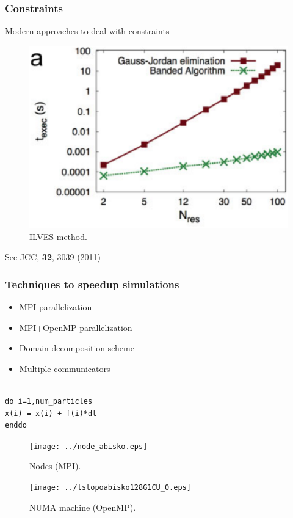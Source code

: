 \documentclass{beamer}
\begin{document}
\begin{frame}\frametitle{Constraints}

Modern approaches to deal with constraints
\begin{figure}
\includegraphics[scale=0.28]{ilves.eps}
\caption{{\scriptsize  ILVES method.}}
\end{figure}

See JCC, {\bf 32}, 3039 (2011)
\end{frame}

\begin{frame}[fragile]\frametitle{Techniques to speedup simulations}


\begin{minipage}[t]{0.48\linewidth}
	\begin{itemize}
        \item MPI parallelization	
	\item MPI+OpenMP parallelization
	\item Domain decomposition scheme
	\item Multiple communicators
	\end{itemize}

\begin{verbatim} 

do i=1,num_particles 
x(i) = x(i) + f(i)*dt 
enddo 

\end{verbatim}

\end{minipage}
\hfill%
\begin{minipage}[t]{0.48\linewidth}

\begin{figure} \texttt{[image: ../node\_abisko.eps]}
\caption{{\scriptsize  Nodes (MPI).}} \end{figure}

\begin{figure}
\texttt{[image: ../lstopoabisko128G1CU\_0.eps]} \caption{{\scriptsize
NUMA machine (OpenMP).}} \end{figure}

\end{minipage}
\end{frame}
\end{document}
